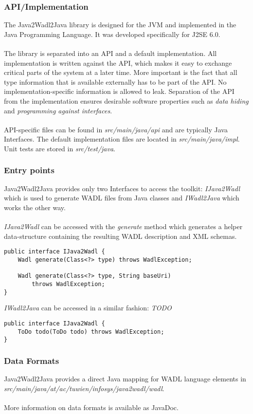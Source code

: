 \subsubsection{API/Implementation}
The Java2Wadl2Java library is designed for the JVM and implemented in the Java Programming Language. It was developed specifically for J2SE 6.0.
\\ \\
The library is separated into an API and a default implementation. All implementation is written against the API, which makes it easy to exchange critical parts of the system at a later time. More important is the fact that all type information that is available externally has to be part of the API. No implementation-specific information is allowed to leak. Separation of the API from the implementation ensures desirable software properties such as \emph{data hiding} and \emph{programming against interfaces}.
\\ \\
API-specific files can be found in \emph{src/main/java/api} and are typically Java Interfaces. The default implementation files are located in \emph{src/main/java/impl}. Unit tests are stored in \emph{src/test/java}.

\subsubsection{Entry points}
Java2Wadl2Java provides only two Interfaces to access the toolkit: \emph{IJava2Wadl} which is used to generate WADL files from Java classes and \emph{IWadl2Java} which works the other way.
\\ \\
\emph{IJava2Wadl} can be accessed with the \emph{generate} method which generates a helper data-structure containing the resulting WADL description and XML schemas.
\begin{lstlisting}
public interface IJava2Wadl {
	Wadl generate(Class<?> type) throws WadlException;
	
	Wadl generate(Class<?> type, String baseUri) 
		throws WadlException;
}
\end{lstlisting}
\emph{IWadl2Java} can be accessed in a similar fashion: \emph{TODO}
\begin{lstlisting}
public interface IJava2Wadl {
	ToDo todo(ToDo todo) throws WadlException;
}
\end{lstlisting}

\subsubsection{Data Formats}
Java2Wadl2Java provides a direct Java mapping for WADL language elements in \emph{src/main/java/at/ac/tuwien/infosys/java2wadl/wadl}. 
\\ \\
More information on data formats is available as JavaDoc.